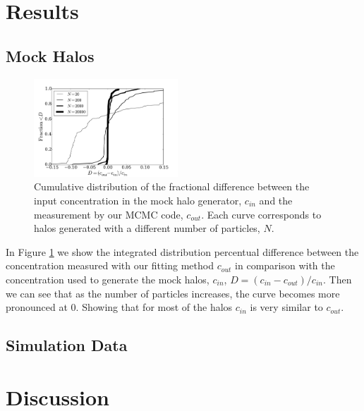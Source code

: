 \documentclass[useAMS,usenatbib]{mn2e}
\begin{document}
\section{Results}
\label{sec:results}


\subsection{Mock Halos}
\label{sec:results_mocks}

\begin{figure}
\begin{center}
  \includegraphics[width=0.48\textwidth]{percentual_diff.pdf}
\end{center}
\caption{Cumulative distribution of the fractional difference between
  the input concentration in the mock halo generator, $c_{in}$ and the
  measurement by our MCMC code, $c_{out}$. Each curve corresponds to
  halos generated with a different number of particles, $N$.
    \label{fig:results_mocks}}
\end{figure}


In Figure \ref{fig:results_mocks} we show the integrated distribution
percentual difference between the concentration measured with our
fitting method $c_{out}$ in comparison with the concentration used to
generate the mock halos, $c_{in}$, $D=(c_{in}-c_{out})/c_{in}$. Then we can see that as the number of particles increases, the curve becomes more pronounced at 0. Showing that for most of the halos $c_{in}$ is very similar to $c_{out}$.


\subsection{Simulation Data}
\label{sec:results_mocks}

\section{Discussion}
\label{sec:discussion}
\end{document}
